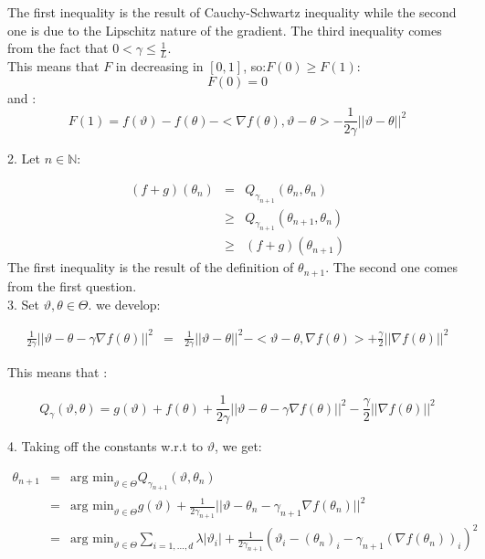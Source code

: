 The first inequality is the result of Cauchy-Schwartz inequality while the second one is due to the Lipschitz nature of the gradient. The third inequality comes from the fact that $0<\gamma\leq \frac{1}{L}$.\\
This means that $F$ in decreasing in $[0,1]$, so:$F(0)\geq F(1)$:
$$F(0)=0$$
and :
$$F(1)=f(\vartheta)- f(\theta)-<\nabla f(\theta),\vartheta-\theta>-\frac{1}{2\gamma}\vert\vert \vartheta-\theta\vert\vert^2$$

2. Let $n \in \mathbb{N}$:

\begin{eqnarray*}
	(f+g)(\theta_{n})&=& Q_{\gamma_{n+1}}(\theta_{n},\theta_{n})\\
							&\geq& Q_{\gamma_{n+1}}(\theta_{n+1},\theta_{n})\\ 
							&\geq& (f+g)(\theta_{n+1})
\end{eqnarray*}
The first inequality is the result of the definition of $\theta_{n+1}$. The second one comes from the first question.\\

3. Set $ \vartheta , \theta \in \Theta$. we develop: 

\begin{eqnarray*}
	\frac{1}{2\gamma}\vert\vert \vartheta - \theta -\gamma \nabla f(\theta) \vert\vert^2&=&\frac{1}{2\gamma}\vert\vert \vartheta - \theta \vert \vert ^2 - <\vartheta - \theta ,\nabla f(\theta)>+\frac{\gamma}{2} \vert\vert \nabla f(\theta)\vert\vert^2
\end{eqnarray*}

This means that :

$$Q_{\gamma}(\vartheta,\theta)= g(\vartheta)+f(\theta)+ 	\frac{1}{2\gamma}\vert\vert \vartheta - \theta -\gamma \nabla f(\theta) \vert\vert^2-\frac{\gamma}{2} \vert\vert \nabla f(\theta)\vert\vert^2$$

4. Taking off the constants w.r.t to $\vartheta$, we get:

\begin{eqnarray*}
	\theta_{n+1}&=& \text{arg min}_{\vartheta \in \Theta} Q_{\gamma_{n+1}} (\vartheta,\theta_n)\\
						&=& \text{arg min}_{\vartheta \in \Theta} g(\vartheta)+\frac{1}{2\gamma_{n+1}}\vert\vert \vartheta - \theta_n -\gamma_{n+1} \nabla f(\theta_n) \vert\vert^2\\
						&=& \text{arg min}_{\vartheta \in \Theta} \sum_{i=1,\dots,d} \lambda \vert \vartheta_i \vert 
					 + \frac{1}{2\gamma_{n+1}}( \vartheta_i -( \theta_n)_i - \gamma_{n+1}( \nabla f(\theta_n))_i )^2
\end{eqnarray*}

